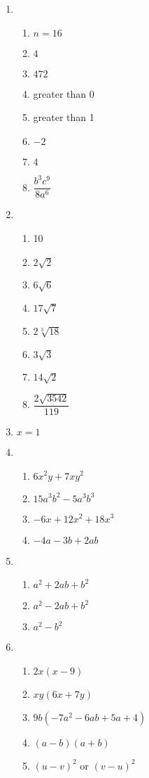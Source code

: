 \documentclass{article}
\begin{document}
\begin{multicols}{2}
\begin{enumerate}
\item \begin{enumerate}
\item $n = 16$
\item $4$
\item $472$
\item greater than 0
\item greater than 1
\item $-2$
\item $4$
\item $\dfrac{b^3c^9}{8a^6}$
\end{enumerate}
\item \begin{enumerate}
\item 10
\item $2\sqrt{2}$
\item $6\sqrt{6}$
\item $17\sqrt{7}$
\item $2\sqrt[3]{18}$
\item $3\sqrt{3}$
\item $14\sqrt{2}$
\item $\dfrac{2\sqrt{3542}}{119}$
\end{enumerate}
\item $x = 1$
\item \begin{enumerate}
\item $6x^2y + 7xy^2$
\item $15a^3b^2 - 5a^3b^3$
\item $-6x + 12x^2 + 18x^3$
\item $-4a - 3b + 2ab$
\end{enumerate}
\item \begin{enumerate}
\item $a^2 + 2ab + b^2$
\item $a^2 - 2ab + b^2$
\item $a^2 - b^2$
\end{enumerate}
\item \begin{enumerate}
\item $2x(x - 9)$
\item $xy(6x + 7y)$
\item $9b(-7a^2 - 6ab + 5a + 4)$
\item $(a - b)(a + b)$
\item $(u - v)^2$ or $(v - u)^2$

\end{enumerate}
\end{enumerate}
\end{multicols}
\end{document}
